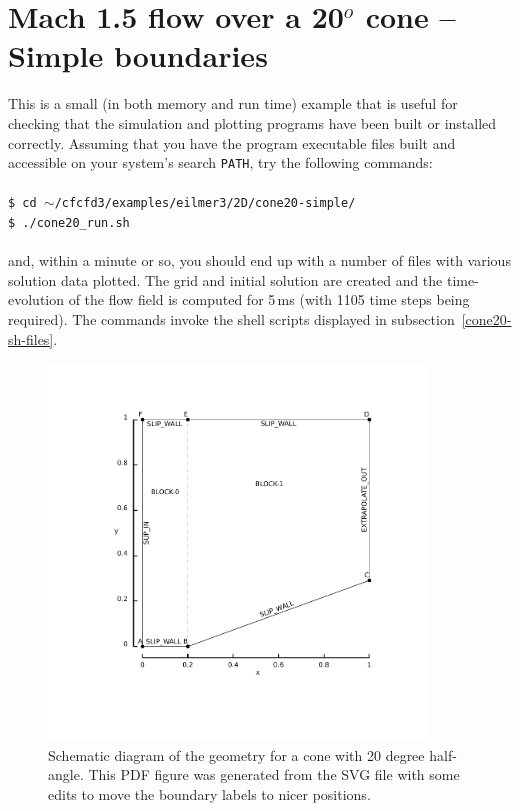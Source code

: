 
\section{Mach 1.5 flow over a 20$^o$ cone -- Simple boundaries}
\label{cone20-simple-sec}
%
This is a small (in both memory and run time) example 
that is useful for checking that the simulation and
plotting programs have been built or installed correctly.
Assuming that you have the program executable files built and
accessible on your system's search \texttt{PATH}, 
try the following commands:\\
%
\topbar\\
\texttt{\$ cd $\sim$/cfcfd3/examples/eilmer3/2D/cone20-simple/}\\
\texttt{\$ ./cone20\_run.sh}\\
\bottombar\\
%
and, within a minute or so, you should end up with a number of files
with various solution data plotted.
The grid and initial solution are created and the time-evolution of the
flow field is computed for 5\,ms (with 1105 time steps being required).
The commands invoke the shell scripts displayed in 
subsection~\ref{cone20-sh-files}.
%

\begin{figure}[htbp]
\begin{center}
\includegraphics[width=10cm, viewport=76 78 389 398]{../2D/cone20-simple/cone20_svg.pdf}
\end{center}
\caption{Schematic diagram of the geometry for a cone 
         with 20 degree half-angle.
	 This PDF figure was generated from the SVG file with some edits 
	 to move the boundary labels to nicer positions.}
\label{cone20-geometry-fig}
\end{figure}

